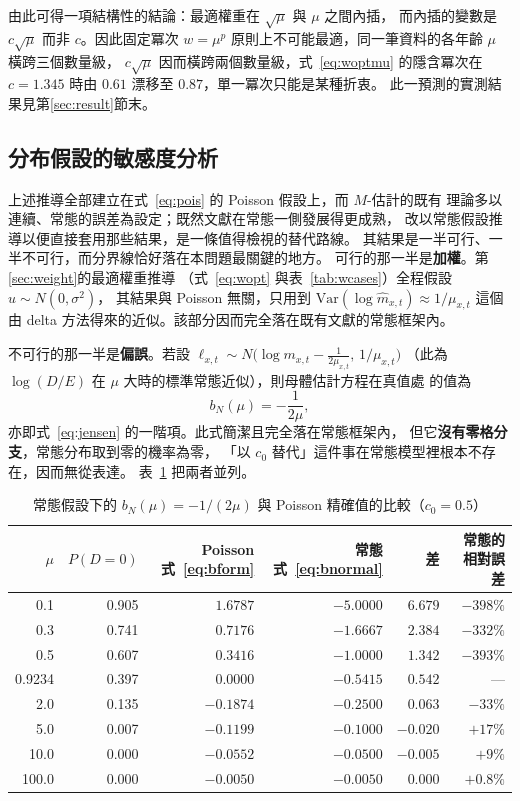 \documentclass[UTF8, fontset=macnew, a4paper, 12pt]{ctexart}
\begin{document}
由此可得一項結構性的結論：最適權重在 $\sqrt{\mu}$ 與 $\mu$ 之間內插，
而內插的變數是 $c\sqrt{\mu}$ 而非 $c$。因此固定冪次 $w=\mu^{p}$
原則上不可能最適，同一筆資料的各年齡 $\mu$ 橫跨三個數量級，
$c\sqrt{\mu}$ 因而橫跨兩個數量級，式~\eqref{eq:woptmu} 的隱含冪次在
$c=1.345$ 時由 $0.61$ 漂移至 $0.87$，單一冪次只能是某種折衷。
此一預測的實測結果見第\ref{sec:result}節末。

\subsection{分布假設的敏感度分析}\label{sec:normal}

上述推導全部建立在式~\eqref{eq:pois} 的 Poisson 假設上，而 $M$-估計的既有
理論多以連續、常態的誤差為設定；既然文獻在常態一側發展得更成熟，
改以常態假設推導以便直接套用那些結果，是一條值得檢視的替代路線。
其結果是一半可行、一半不可行，而分界線恰好落在本問題最關鍵的地方。
可行的那一半是\textbf{加權}。第\ref{sec:weight}的最適權重推導
（式~\eqref{eq:wopt} 與表~\ref{tab:wcases}）全程假設 $u\sim N(0,\sigma^2)$，
其結果與 Poisson 無關，只用到 $\mathrm{Var}(\log\hat m_{x,t})\approx1/\mu_{x,t}$
這個由 delta 方法得來的近似。該部分因而完全落在既有文獻的常態框架內。

不可行的那一半是\textbf{偏誤}。若設
$\ell_{x,t}\sim N\!\big(\log m_{x,t}-\tfrac{1}{2\mu_{x,t}},\,1/\mu_{x,t}\big)$
（此為 $\log(D/E)$ 在 $\mu$ 大時的標準常態近似），則母體估計方程在真值處
的值為
\begin{equation}\label{eq:bnormal}
b_N(\mu)=-\frac{1}{2\mu},
\end{equation}
亦即式~\eqref{eq:jensen} 的一階項。此式簡潔且完全落在常態框架內，
但它\textbf{沒有零格分支}，常態分布取到零的機率為零，
「以 $c_0$ 替代」這件事在常態模型裡根本不存在，因而無從表達。
表~\ref{tab:normal} 把兩者並列。

\begin{table}[H]
\centering
\caption{常態假設下的 $b_N(\mu)=-1/(2\mu)$ 與 Poisson 精確值的比較（$c_0=0.5$）}
\small
\begin{tabular}{rrrrrr}
\toprule
$\mu$ & $P(D=0)$ & Poisson 式~\eqref{eq:bform} & 常態 式~\eqref{eq:bnormal}
 & 差 & 常態的相對誤差\\
\midrule
0.1   & 0.905 & $1.6787$  & $-5.0000$ & $6.679$  & $-398\%$\\
0.3   & 0.741 & $0.7176$  & $-1.6667$ & $2.384$  & $-332\%$\\
0.5   & 0.607 & $0.3416$  & $-1.0000$ & $1.342$  & $-393\%$\\
0.9234& 0.397 & $0.0000$  & $-0.5415$ & $0.542$  & ---\\
2.0   & 0.135 & $-0.1874$ & $-0.2500$ & $0.063$  & $-33\%$\\
5.0   & 0.007 & $-0.1199$ & $-0.1000$ & $-0.020$ & $+17\%$\\
10.0  & 0.000 & $-0.0552$ & $-0.0500$ & $-0.005$ & $+9\%$\\
100.0 & 0.000 & $-0.0050$ & $-0.0050$ & $0.000$  & $+0.8\%$\\
\bottomrule
\end{tabular}
\label{tab:normal}
\end{table}
\end{document}
